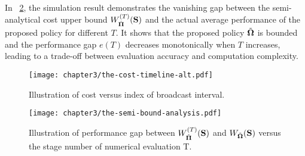 In \figurename~\ref{fig:semi-bound}, the simulation result demonstrates the vanishing gap between the semi-analytical cost upper bound $W^{(T)}_{\hat{\mathbf{\Pi}}}(\mathbf{S})$ and the actual average performance of the proposed policy for different $T$.
It shows that the proposed policy $\tilde{\boldsymbol{\Omega}}$ is bounded and the performance gap $e(T)$ decreases monotonically when $T$ increases, leading to a trade-off between evaluation accuracy and computation complexity.

\begin{figure*}[ht!]                                                                             %
    \centering                                                                                  %
    \texttt{[image: chapter3/the-cost-timeline-alt.pdf]}                     %
    \caption{Illustration of cost versus index of broadcast interval.}
    \label{fig:general_timeline}                                                                %
\end{figure*}                                                                                    %

\begin{figure*}[ht!]                                                                             %
    \centering                                                                                  %
    \texttt{[image: chapter3/the-semi-bound-analysis.pdf]}                     %
    \caption{Illustration of performance gap between $W^{(T)}_{\hat{\mathbf{\Pi}}}(\mathbf{S})$ and $W_{\tilde{\boldsymbol{\Omega}}}(\mathbf{S})$ versus the stage number of numerical evaluation T.}
    \label{fig:semi-bound}                                                                %
\end{figure*}                                                                                    %

